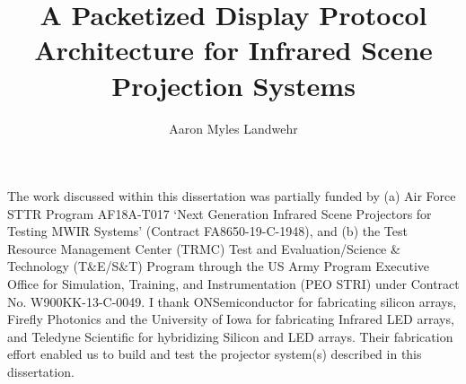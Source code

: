 \documentclass{udthesis}
\begin{document}
    \title[A Packetized Display Protocol Architecture for Infrared Scene Projection Systems]{A Packetized Display Protocol Architecture for Infrared Scene Projection Systems}
    \author{Aaron Myles Landwehr}
    \majorfieldtrue{}
    \subject{Subject}

    \maketitlepage

    \begin{approvalpage}
    \end{approvalpage}

    \begin{signedpage} %
    \end{signedpage}

    \begin{front} %
            
            The work discussed within this dissertation was partially funded by (a) Air Force STTR Program AF18A-T017 `Next Generation Infrared Scene Projectors for Testing MWIR Systems' (Contract FA8650-19-C-1948), and (b) the Test Resource Management Center (TRMC) Test and Evaluation/Science \& Technology (T\&E/S\&T) Program through the US Army Program Executive Office for Simulation, Training, and Instrumentation (PEO STRI) under Contract No. W900KK-13-C-0049. I thank ONSemiconductor for fabricating silicon arrays, Firefly Photonics and the University of Iowa for fabricating Infrared LED arrays, and Teledyne Scientific for hybridizing Silicon and LED arrays. Their fabrication effort enabled us to build and test the projector system(s) described in this dissertation.
        \maketocloflot
            
    \end{front}
\end{document}
